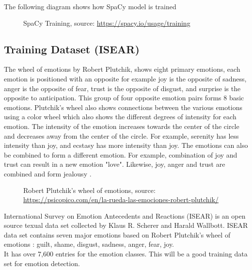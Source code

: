 The following diagram shows how SpaCy model is trained

\begin{figure}[h]
  \centering
  \caption[SpaCy Training]%
  {SpaCy Training, source: \url{https://spacy.io/usage/training}}
  \label{fig:ALAP:sm3}
\end{figure}
 
\clearpage

\subsection{Training Dataset (ISEAR)}

The wheel of emotions by Robert Plutchik, shows eight primary emotions, each emotion is positioned with an opposite for example joy is the opposite of sadness, anger is the opposite of fear, trust is the opposite of disgust, and surprise is the opposite to anticipation. This group of four opposite emotion pairs forms 8 basic emotions. Plutchik's wheel also shows connections between the various emotions using a color wheel which also shows the different degrees of intensity for each emotion. The intensity of the emotion increases towards the center of the circle and decreases away from the center of the circle. For example, serenity has less intensity than joy, and ecstasy has more intensity than joy. The emotions can also be combined to form a different emotion. For example, combination of joy and trust can result in a new emotion "love". Likewise, joy, anger and trust are combined and form jealousy \cite{ref4}.

\begin{figure}[h]
  \centering
  \caption[Robert Plutchik's wheel of emotions]%
  {Robert Plutchik's wheel of emotions, source: \url{https://psicopico.com/en/la-rueda-las-emociones-robert-plutchik/}}
  \label{fig:ALAP:sm3}
\end{figure}

International Survey on Emotion Antecedents and Reactions (ISEAR) is an open source texual data set collected by Klaus R. Scherer and Harald Wallbott. 
ISEAR data set contains seven major emotions based on Robert Plutchik's wheel of emotions : guilt, shame, disgust, sadness, anger, fear,  joy.\\
It has over 7,600 entries for the emotion classes. This will be a good training data set for emotion detection.
\clearpage

